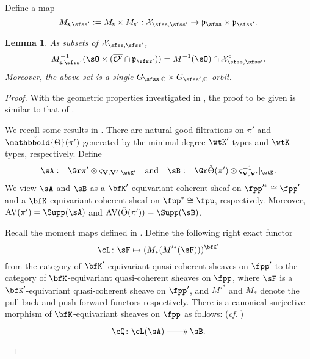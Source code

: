 \documentclass[12pt,a4paper]{amsart}
\newcommand{\AV}{\mathrm{AV}}
\newcommand{\CO}{{\mathcal {O}}}
\newcommand{\CX}{{\mathcal {X}}}
\newcommand{\p}{\mathfrak p}
\numberwithin{equation}{section}
\newtheorem{lem}[thm]{Lemma}
\theoremstyle{remark}
\def\slift{\cL}
\def\bbThetav{\check{\mathbbold{\Theta}}}
\def\Thetav{\check{\Theta}}
\def\Thetav{\check{\Theta}}
\def\mktvvp{\varsigma_{{\bf V},{\bf V}'}}
\begin{document}
Define a map
\[
   M_{\mathsf s, \sfss'}:= M_{\mathsf s}\times M_{\mathsf s'}: \CX_{\sfss, \sfss'}\rightarrow \p_\sfss\times \p_{\sfss'}.
\]


\begin{lem}
As subsets of $\CX_{\sfss, \sfss'}$, 
\[
    M_{\mathsf s, \sfss'}^{-1}(\sO\times (\overline{\CO'}\cap \p_{\sfss'})) = M^{-1}(\sO)\cap \CX_{\sfss, \sfss'}^\circ.
    \]
Moreover, the above set is a single $G_{\sfss, \C}\times G_{\sfss',\C}$-orbit. 
\end{lem}


\begin{proof}%
With the geometric properties investigated in , the proof to be given is
similar to that of \cite[Theorem~C]{LM}.


We recall some results in \cite{LM}. There are natural
good filtrations on $\pi'$ and $\bbThetav(\pi')$ generated by the minimal degree
$\wtK'$-types and $\wtK$-types, respectively. Define
\[
  \sA := \Gr \pi' \otimes \mktvvp|_{\wtK'}
  \quad \text{and} \quad
  \sB := \Gr \Thetav(\pi') \otimes \mktvvp^{-1}|_{\wtK}.
\]
We view $\sA$ and $\sB$  as a $\bfK'$-equivariant coherent sheaf on
$\fpp'^*\cong \fpp'$ and a $\bfK$-equivariant coherent sheaf on
$\fpp^* \cong \fpp$, respectively. Moreover, $\AV(\pi') = \Supp(\sA)$ and $\AV(\Thetav(\pi')) = \Supp(\sB)$.

Recall the moment maps defined in .
Define the following right exact functor
\[
\slift\colon \sF \mapsto (M_*(M'^*(\sF)))^{\bfK'}
\]
from the category of $\bfK'$-equivariant quasi-coherent sheaves on $\fpp'$ to
the category of $\bfK$-equivariant quasi-coherent sheaves on $\fpp$, where
$\sF$ is a $\bfK'$-equivariant quasi-coherent sheave on $\fpp'$, and
$M'^*$ and $M_*$ denote the pull-back and push-forward functors respectively. %
There is a canonical surjective morphism of
$\bfK$-equivariant sheaves on $\fpp$ as follows:
(\emph{cf}. \cite[Equation~(16)]{LM})
\[%
\xymatrix{
\cQ \colon \slift(\sA) \ar@{->>}[r]& \sB.
}
\]%


\end{proof}
\end{document}

